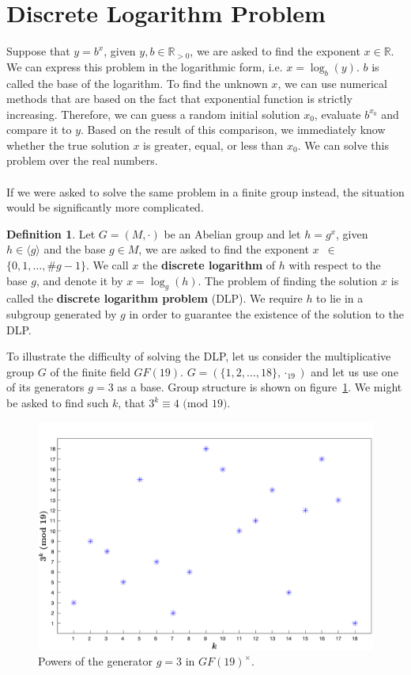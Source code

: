 \documentclass[thesis=M,english]{FITthesis}[2012/10/20]
\theoremstyle{remark}
\theoremstyle{definition}
\newtheorem{DF}{Definition}[section]
\begin{document}
\section{Discrete Logarithm Problem}
Suppose that $y = b^x$, given $y,b \in \mathbb{R}_{> 0}$, we are asked to find the exponent $x \in \mathbb{R}$. We can express this problem in the logarithmic form, i.e. $x = \log_b(y)$. $b$ is called the base of the logarithm. To find the unknown $x$, we can use numerical methods that are based on the fact that exponential function is strictly increasing. Therefore, we can guess a random initial solution $x_0$, evaluate $b^{x_0}$ and compare it to $y$. Based on the result of this comparison, we immediately know whether the true solution $x$ is greater, equal, or less than $x_0$. We can solve this problem over the real numbers.
\\
\\
\noindent If we were asked to solve the same problem in a finite group instead, the situation would be significantly more complicated.
\begin{DF}
Let $G = (M, \cdot)$ be an Abelian group and let $h = g^x$, given $h \in \langle g \rangle$ and the base $g \in M$, we are asked to find the exponent $x$~$\in$~$\{0,1, \ldots, \#g - 1\}.$ We call $x$ the \textbf{discrete logarithm} of $h$ with respect to the base $g$, and denote it by $x= \log_g(h)$. The problem of finding the solution $x$ is called the \textbf{discrete logarithm problem} (DLP). We require $h$ to lie in a subgroup generated by $g$ in order to guarantee the existence of the solution to the DLP. 
\end{DF}
\noindent To illustrate the difficulty of solving the DLP, let us consider the multiplicative group $G$ of the finite field $GF(19).$ $G = (\{1,2,\ldots,18\}, \cdot_{19})$ and let us use one of its generators $g=3$ as a base. Group structure is shown on figure~\ref{fig2}. We might be asked to find such $k$, that $3^k \equiv 4 \text{ (mod 19)}$. 
 \begin{figure}[h]
\hspace*{-2cm}
 	\includegraphics[width=1.25\textwidth]{graph3in19.png}
 	\caption[Example of the group structure of $GF(19)^\times$]{Powers of the generator $g = 3$ in $GF(19)^\times$.}
 	\label{fig2}
 \end{figure}
\end{document}
